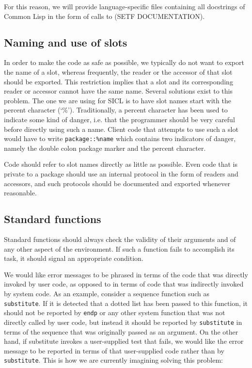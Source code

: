\documentclass{article}
\def\sysname{SICL}
\begin{document}
For this reason, we will provide language-specific files containing
all docstrings of Common Lisp in the form of calls to (SETF
DOCUMENTATION). 

\subsection{Naming and use of slots}

In order to make the code as safe as possible, we typically do not
want to export the name of a slot, whereas frequently, the reader or
the accessor of that slot should be exported.  This restriction
implies that a slot and its corresponding reader or accessor cannot
have the same name.  Several solutions exist to this problem.  The one
we are using for \sysname{} is to have slot names start with the
percent character (`\%').  Traditionally, a percent character has been
used to indicate some kind of danger, i.e. that the programmer should
be very careful before directly using such a name.  Client code that
attempts to use such a slot would have to write
\texttt{package::\%name} which contains two indicators of danger,
namely the double colon package marker and the percent character.

Code should refer to slot names directly as little as possible.  Even
code that is private to a package should use an internal protocol in
the form of readers and accessors, and such protocols should be
documented and exported whenever reasonable. 

\subsection{Standard functions}

Standard functions should always check the validity of their arguments
and of any other aspect of the environment.  If such a function fails
to accomplish its task, it should signal an appropriate condition.  

We would like error messages to be phrased in terms of the code that
was directly invoked by user code, as opposed to in terms of code that
was indirectly invoked by system code.  As an example, consider a
sequence function such as \texttt{substitute}.  If it is detected that
a dotted list has been passed to this function, it should not be
reported by \texttt{endp} or any other system function that was not
directly called by user code, but instead it should be reported by
\texttt{substitute} in terms of the sequence that was originally
passed as an argument.  On the other hand, if substitute invokes a
user-supplied test that fails, we would like the error message to be
reported in terms of that user-supplied code rather than by
\texttt{substitute}.  This is how we are currently imagining solving
this problem:
\end{document}
